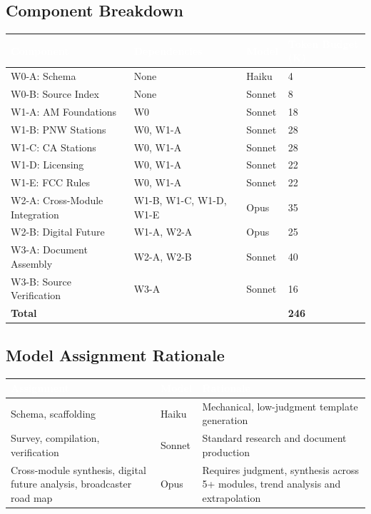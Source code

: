 \documentclass[11pt,letterpaper]{article}
\newcommand{\tableheader}[1]{\textbf{\sffamily\textcolor{white}{#1}}}
\begin{document}
\begin{asciibox}
\subsection{Component Breakdown}

\begin{center}
\begin{tabularx}{\textwidth}{L{2.5cm}L{2.5cm}C{1.5cm}C{2cm}}
\toprule
{}
\tableheader{Component} & \tableheader{Dependencies} & \tableheader{Model} & \tableheader{Token Budget (K)} \\
\midrule
W0-A: Schema & None & Haiku & 4 \\
W0-B: Source Index & None & Sonnet & 8 \\
W1-A: AM Foundations & W0 & Sonnet & 18 \\
W1-B: PNW Stations & W0, W1-A & Sonnet & 28 \\
W1-C: CA Stations & W0, W1-A & Sonnet & 28 \\
W1-D: Licensing & W0, W1-A & Sonnet & 22 \\
W1-E: FCC Rules & W0, W1-A & Sonnet & 22 \\
W2-A: Cross-Module Integration & W1-B, W1-C, W1-D, W1-E & Opus & 35 \\
W2-B: Digital Future & W1-A, W2-A & Opus & 25 \\
W3-A: Document Assembly & W2-A, W2-B & Sonnet & 40 \\
W3-B: Source Verification & W3-A & Sonnet & 16 \\
\textbf{Total} & & & \textbf{246} \\
\bottomrule
\end{tabularx}
\end{center}

\subsection{Model Assignment Rationale}

\begin{center}
\begin{tabularx}{\textwidth}{L{2.5cm}C{1.5cm}X}
\toprule
{}
\tableheader{Assignment} & \tableheader{Model} & \tableheader{Rationale} \\
\midrule
Schema, scaffolding & Haiku & Mechanical, low-judgment template generation \\
Survey, compilation, verification & Sonnet & Standard research and document production \\
Cross-module synthesis, digital future analysis, broadcaster road map & Opus & Requires judgment, synthesis across 5+ modules, trend analysis and extrapolation \\
\bottomrule
\end{tabularx}
\end{center}


\end{asciibox}
\end{document}
